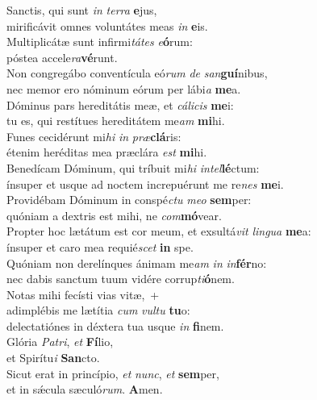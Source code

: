 \evenverse Sanctis, qui sunt \textit{in} \textit{ter}\textit{ra} \textbf{e}jus,~\*\\
\evenverse mirificávit omnes voluntátes meas \textit{in} \textbf{e}is.\\
\oddverse Multiplicátæ sunt infirmi\textit{tá}\textit{tes} \textit{e}\textbf{ó}rum:~\*\\
\oddverse póstea accele\textit{ra}\textbf{vé}runt.\\
\evenverse Non congregábo conventícula eó\textit{rum} \textit{de} \textit{san}\textbf{guí}nibus,~\*\\
\evenverse nec memor ero nóminum eórum per lábi\textit{a} \textbf{me}a.\\
\oddverse Dóminus pars hereditátis meæ, et \textit{cá}\textit{li}\textit{cis} \textbf{me}i:~\*\\
\oddverse tu es, qui restítues hereditátem me\textit{am} \textbf{mi}hi.\\
\evenverse Funes cecidérunt mi\textit{hi} \textit{in} \textit{præ}\textbf{clá}ris:~\*\\
\evenverse étenim heréditas mea præclára \textit{est} \textbf{mi}hi.\\
\oddverse Benedícam Dóminum, qui tríbuit mi\textit{hi} \textit{in}\textit{tel}\textbf{lé}ctum:~\*\\
\oddverse ínsuper et usque ad noctem increpuérunt me re\textit{nes} \textbf{me}i.\\
\evenverse Providébam Dóminum in conspé\textit{ctu} \textit{me}\textit{o} \textbf{sem}per:~\*\\
\evenverse quóniam a dextris est mihi, ne \textit{com}\textbf{mó}vear.\\
\oddverse Propter hoc lætátum est cor meum, et exsultá\textit{vit} \textit{lin}\textit{gua} \textbf{me}a:~\*\\
\oddverse ínsuper et caro mea requié\textit{scet} \textbf{in} spe.\\
\evenverse Quóniam non derelínques ánimam me\textit{am} \textit{in} \textit{in}\textbf{fér}no:~\*\\
\evenverse nec dabis sanctum tuum vidére corrup\textit{ti}\textbf{ó}nem.\\
\oddverse Notas mihi fecísti vias vitæ,~+\\
\oddverse  adimplébis me lætítia \textit{cum} \textit{vul}\textit{tu} \textbf{tu}o:~\*\\
\oddverse delectatiónes in déxtera tua usque \textit{in} \textbf{fi}nem.\\
\evenverse Glória \textit{Pa}\textit{tri}, \textit{et} \textbf{Fí}lio,~\*\\
\evenverse et Spirítu\textit{i} \textbf{San}cto.\\
\oddverse Sicut erat in princípio, \textit{et} \textit{nunc}, \textit{et} \textbf{sem}per,~\*\\
\oddverse et in sǽcula sæculó\textit{rum}. \textbf{A}men.\\
